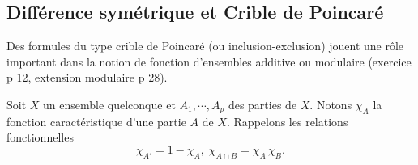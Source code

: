 \subsection{Différence symétrique et Crible de Poincaré}\label{criblePoinc}
Des formules du type crible de Poincaré (ou inclusion-exclusion) jouent une rôle important dans la notion de fonction d'ensembles additive ou modulaire (exercice p 12, extension modulaire p 28).

\noindent Soit $X$ un ensemble quelconque et $A_1, \cdots, A_p$ des parties de $X$. Notons $\chi_A$ la fonction caractéristique d'une partie $A$ de $X$. Rappelons les relations fonctionnelles
\begin{displaymath}
  \chi_{A'} = 1 - \chi_A, \; \chi_{A \cap B} = \chi_A \, \chi_B.
\end{displaymath}

